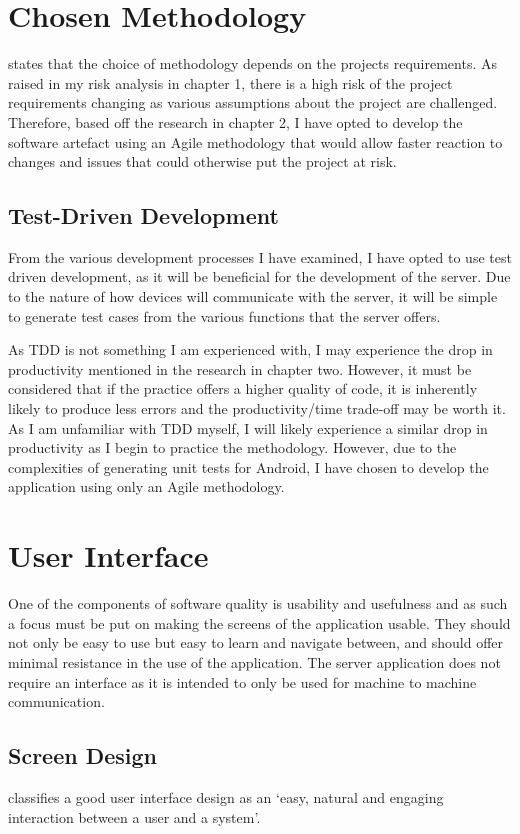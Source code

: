 \section{Chosen Methodology}
\cite{balaji2012waterfall} states that the choice of methodology depends on the projects requirements.
As raised in my risk analysis in chapter 1, there is a high risk of the project requirements changing as various assumptions about the project are challenged.
Therefore, based off the research in chapter 2, I have opted to develop the software artefact using an Agile methodology that would allow faster reaction to changes and issues that could otherwise put the project at risk.

\subsection{Test-Driven Development}
From the various development processes I have examined, I have opted to use test driven development, as it will be beneficial for the development of the server.
Due to the nature of how devices will communicate with the server, it will be simple to generate test cases from the various functions that the server offers.

As TDD is not something I am experienced with, I may experience the drop in productivity mentioned in the research in chapter two.
However, it must be considered that if the practice offers a higher quality of code, it is inherently likely to produce less errors and the productivity/time trade-off may be worth it.
As I am unfamiliar with TDD myself, I will likely experience a similar drop in productivity as I begin to practice the methodology.
However, due to the complexities of generating unit tests for Android, I have chosen to develop the application using only an Agile methodology.

\section{User Interface}
One of the components of software quality is usability and usefulness \citep{isosoftwarequality} and as such a focus must be put on making the screens of the application usable.
They should not only be easy to use but easy to learn and navigate between, and should offer minimal resistance in the use of the application.
The server application does not require an interface as it is intended to only be used for machine to machine communication.

\subsection{Screen Design}
\cite{stone2005user} classifies a good user interface design as an `easy, natural and engaging interaction between a user and a system'.

